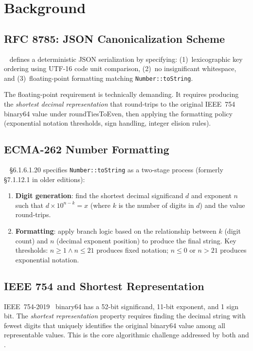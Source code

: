 \section{Background}
\label{sec:background}

\subsection{RFC 8785: JSON Canonicalization Scheme}

\rfcjcs~\cite{rfc8785} defines a deterministic JSON serialization by
specifying: (1)~lexicographic key ordering using UTF-16 code unit
comparison, (2)~no insignificant whitespace, and (3)~floating-point
formatting matching \ecma \texttt{Number::toString}.

The floating-point requirement is technically demanding.  It
requires producing the \emph{shortest decimal representation} that
round-trips to the original IEEE~754 binary64 value under
roundTiesToEven, then applying the \ecma formatting policy (exponential
notation thresholds, sign handling, integer elision rules).

\subsection{ECMA-262 Number Formatting}

\ecma~\cite{ecma262} \S6.1.6.1.20 specifies \texttt{Number::toString} as
a two-stage process (formerly \S7.1.12.1 in older editions):

\begin{enumerate}
\item \textbf{Digit generation}: find the shortest decimal significand
      $d$ and exponent $n$ such that $d \times 10^{n-k} = x$ (where $k$
      is the number of digits in $d$) and the value round-trips.

\item \textbf{Formatting}: apply branch logic based on the relationship
      between $k$ (digit count) and $n$ (decimal exponent position) to
      produce the final string.  Key thresholds: $n \geq 1 \land n \leq
      21$ produces fixed notation; $n \leq 0$ or $n > 21$ produces
      exponential notation.
\end{enumerate}

\subsection{IEEE 754 and Shortest Representation}

IEEE~754-2019~\cite{ieee754} binary64 has a 52-bit significand, 11-bit
exponent, and 1 sign bit.  The \emph{shortest representation} property
requires finding the decimal string with fewest digits that uniquely
identifies the original binary64 value among all representable values.
This is the core algorithmic challenge addressed by both \burgerdybvig
and \schubfach.
